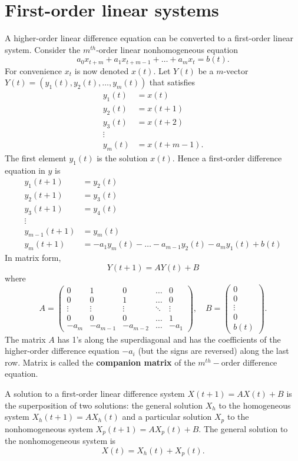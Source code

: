 \section{First-order linear systems}
A higher-order linear difference equation can be converted to a first-order linear system.
Consider the $m^{th}$-order linear nonhomogeneous equation 
\[
a_0x_{t+m}+a_1x_{t+m-1}+\dots + a_m x_{t}=b(t).
\]
For convenience $x_t$ is now denoted $x(t)$. Let $Y(t)$ be a $m$-vector  $Y(t)=(y_1(t),y_2(t),\dots, y_m(t))$ that satisfies
\begin{align*}
y_1(t)&=x(t)\\
y_2(t)&=x(t+1)\\
y_3(t)&=x(t+2)\\
\vdots& \\
y_{m}(t)&=x(t+m-1).
\end{align*}
The first element $y_1(t)$ is the solution $x(t)$. Hence a first-order difference equation in $y$ is 
\begin{align*}
y_1(t+1)&=y_2(t)\\
y_2(t+1)&=y_3(t)\\
y_3(t+1)&=y_4(t)\\
\vdots &\\
y_{m-1}(t+1)&=y_{m}(t)\\
y_{m}(t+1)&=-a_1 y_m(t)-\dots -a_{m-1}y_2(t)- a_m y_1(t)+b(t)
\end{align*}
In matrix form,
$$Y(t+1)=AY(t)+B$$
where
$$A=\left (
\begin{array}{ccccc}
0 & 1 & 0 & \hdots & 0\\
0 & 0 & 1 & \hdots & 0\\
\vdots & \vdots & \vdots & \ddots & \vdots\\
0 & 0 & 0 & \hdots & 1\\
-a_{m} & -a_{m-1} & -a_{m-2} & \hdots & -a_{1}
\end{array}
\right), \quad B=\left ( \begin{array}{c}
0\\
0\\
\vdots\\
0\\
b(t)
\end{array}
\right).
$$ 
The matrix $A$ has 1's along the superdiagonal and has the coefficients of the higher-order difference equation $-a_i$ (but the signs are reversed) along the last row. Matrix is called the {\bf companion matrix} of the $m^{th}-$order difference equation.


A solution to a first-order linear difference system $X(t+1)=AX(t)+B$ is the superposition of two solutions: the general solution $X_h$ to the homogeneous system $X_h(t+1)=AX_h(t)$ and a particular solution $X_p$ to the nonhomogeneous system $X_p(t+1)=AX_p(t)+B$. The general solution to the nonhomogeneous system is $$X(t)=X_h(t)+X_p(t).$$


